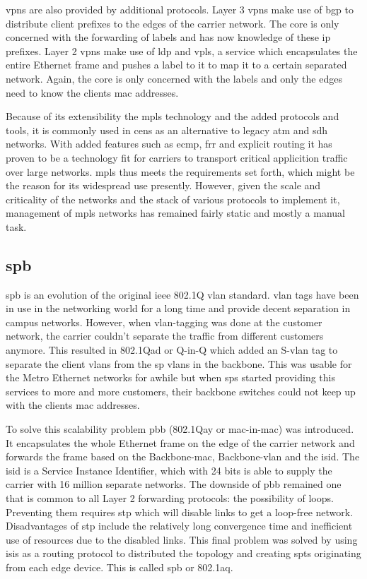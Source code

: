 \acp{vpn} are also provided by additional protocols. Layer 3 \acp{vpn} make use of \ac{bgp} to distribute client prefixes to the edges of the carrier network. The core is only concerned with the forwarding of labels and has now knowledge of these \acs{ip} prefixes. Layer 2 \acp{vpn} make use of \ac{ldp} and \ac{vpls}, a service which encapsulates the entire Ethernet frame and pushes a label to it to map it to a certain separated network. Again, the core is only concerned with the labels and only the edges need to know the clients \acs{mac} addresses. 

Because of its extensibility the \ac{mpls} technology and the added protocols and tools, it is commonly used in \acp{cen} as an alternative to legacy \acs{atm} and \acs{sdh} networks. With added features such as \ac{ecmp}, \ac{frr} and explicit routing it has proven to be a technology fit for carriers to transport critical applicition traffic over large networks. \ac{mpls} thus meets the requirements set forth, which might be the reason for its widespread use presently. However, given the scale and criticality of the networks and the stack of various protocols to implement it, management of \ac{mpls} networks has remained fairly static and mostly a manual task.


\subsection{\acs{spb}} %
\label{sub:spb}
\ac{spb} is an evolution of the original \acs{ieee} 802.1Q \ac{vlan} standard. \ac{vlan} tags have been in use in the networking world for a long time and provide decent separation in campus networks. However, when \ac{vlan}-tagging was done at the customer network, the carrier couldn't separate the traffic from different customers anymore. This resulted in 802.1Qad or Q-in-Q which added an S-\ac{vlan} tag to separate the client \acp{vlan} from the \ac{sp} \acp{vlan} in the backbone. This was usable for the Metro Ethernet networks for awhile but when \acp{sp} started providing this services to more and more customers, their backbone switches could not keep up with the clients \ac{mac} addresses.

To solve this scalability problem \ac{pbb} (802.1Qay or \ac{mac}-in-\ac{mac}) was introduced. It encapsulates the whole Ethernet frame on the edge of the carrier network and forwards the frame based on the Backbone-\ac{mac}, Backbone-\ac{vlan} and the \ac{isid}. The \ac{isid} is a Service Instance Identifier, which with 24 bits is able to supply the carrier with 16 million separate networks. The downside of \ac{pbb} remained one that is common to all Layer 2 forwarding protocols: the possibility of loops. Preventing them requires \ac{stp} which will disable links to get a loop-free network. Disadvantages of \ac{stp} include the relatively long convergence time and inefficient use of resources due to the disabled links. This final problem was solved by using \acs{isis} as a routing protocol to distributed the topology and creating \acp{spt} originating from each edge device. This is called \ac{spb} or 802.1aq.

